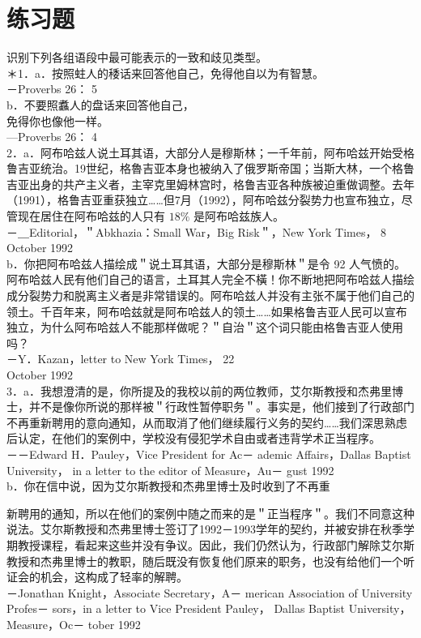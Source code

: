 \section*{练习题}
识别下列各组语段中最可能表示的一致和歧见类型。\\
＊1．a．按照蛀人的䅗话来回答他自己，免得他自以为有智慧。\\
－Proverbs 26： 5\\
b．不要照䘄人的盘话来回答他自己，\\
免得你也像他一样。\\
—Proverbs 26： 4\\
2．a．阿布哈兹人说土耳其语，大部分人是穆斯林；一千年前，阿布哈兹开始受格鲁吉亚统治。19世纪，格魯吉亚本身也被纳入了俄罗斯帝国；当斯大林，一个格鲁吉亚出身的共产主义者，主宰克里姆林宫时，格鲁吉亚各种族被迫重做调整。去年（1991），格鲁吉亚重获独立……但7月（1992），阿布哈兹分裂势力也宣布独立，尽管现在居住在阿布哈兹的人只有 $18 \%$ 是阿布哈兹族人。\\
－＿Editorial，＂Abkhazia：Small War，Big Risk＂，New York Times， 8 October 1992\\
b．你把阿布哈兹人描绘成＂说土耳其语，大部分是穆斯林＂是令 92 人气愤的。阿布哈兹人民有他们自己的语言，土耳其人完全不橫！你不断地把阿布哈兹人描绘成分裂势力和脱离主义者是非常错误的。阿布哈兹人并没有主张不属于他们自己的领土。千百年来，阿布哈兹就是阿布哈兹人的领土……如果格鲁吉亚人民可以宣布独立，为什么阿布哈兹人不能那样做呢？＂自治＂这个词只能由格鲁吉亚人使用吗？\\
－Y．Kazan，letter to New York Times， 22\\
October 1992\\
3．a．我想澄清的是，你所提及的我校以前的两位教师，艾尔斯教授和杰弗里博士，并不是像你所说的那样被＂行政性暂停职务＂。事实是，他们接到了行政部门不再重新聘用的意向通知，从而取消了他们继续履行义务的契约……我们深思熟虑后认定，在他们的案例中，学校没有侵犯学术自由或者违背学术正当程序。\\
－－Edward H．Pauley，Vice President for Ac－ ademic Affairs，Dallas Baptist University， in a letter to the editor of Measure，Au－ gust 1992\\
b．你在信中说，因为艾尔斯教授和杰弗里博士及时收到了不再重

新聘用的通知，所以在他们的案例中随之而来的是＂正当程序＂。我们不同意这种说法。艾尔斯教授和杰弗里博士签订了1992－1993学年的契约，并被安排在秋季学期教授课程，看起来这些并没有争议。因此，我们仍然认为，行政部门解除艾尔斯教授和杰弗里博士的教职，随后既没有恢复他们原来的职务，也没有给他们一个听证会的机会，这构成了轻率的解聘。\\
－Jonathan Knight，Associate Secretary，A－ merican Association of University Profes－ sors，in a letter to Vice President Pauley， Dallas Baptist University，Measure，Oc－ tober 1992

